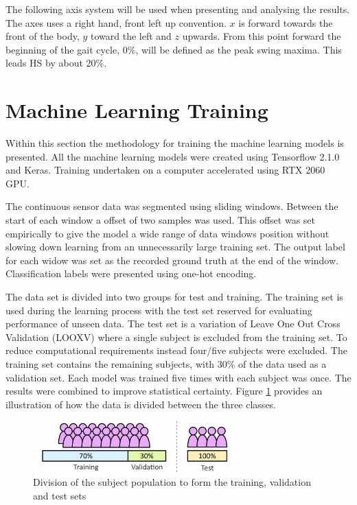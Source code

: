 \documentclass[sensors,article,submit,moreauthors,pdftex]{Definitions/mdpi}
\begin{document}
The following axis system will be used when presenting and analysing the results. The axes uses a right hand, front left up convention. $x$ is forward towards the front of the body, $y$ toward the left and $z$ upwards. From this point forward the beginning of the gait cycle, 0\%, will be defined as the peak swing maxima. This leads HS by about 20\%.



\section{Machine Learning Training}
\label{sec:machine_Learning}
Within this section the methodology for training the machine learning models is presented. All the machine learning models were created using Tensorflow 2.1.0 and Keras. Training undertaken on a computer accelerated using RTX 2060 GPU.

The continuous sensor data was segmented using sliding windows. Between the start of each window a offset of two samples was used. This offset was set empirically to give the model a wide range of data windows position without slowing down learning from an unnecessarily large training set. The output label for each widow was set as the recorded ground truth at the end of the window. Classification labels were presented using one-hot encoding.

The data set is divided into two groups for test and training. The training set is used during the learning process with the test set reserved for evaluating performance of unseen data. The test set is a variation of Leave One Out Cross Validation (LOOXV) where a single subject is excluded from the training set. To reduce computational requirements instead four/five subjects were excluded. The training set contains the remaining subjects, with 30\% of the data used as a validation set. Each model was trained five times with each subject was once. The results were combined to improve statistical certainty. Figure \ref{fig:test_training_split} provides an illustration of how the data is divided between the three classes.

\begin{figure}[!hbt]
    \centering
    \includegraphics[width=0.7\textwidth]{Figures/test_train_split.jpg}
    \caption{Division of the subject population to form the training, validation and test sets}
    \label{fig:test_training_split}
\end{figure}
\end{document}
